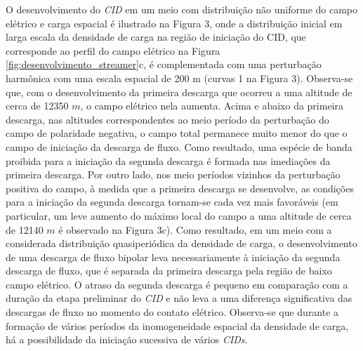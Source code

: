 \documentclass[a4paper, 12pt, onecolumn,singlespacing]{article}
\begin{document}
	O desenvolvimento do \textit{CID} em um meio com distribuição não uniforme do campo elétrico e carga espacial é ilustrado na Figura 3, onde a distribuição inicial em larga escala da densidade de carga na região de iniciação do CID, que corresponde ao perfil do campo elétrico na Figura \ref{fig:desenvolvimento_streamer}c, é complementada com uma perturbação harmônica com uma escala espacial de 200 m (curvas 1 na Figura 3). Observa-se que, com o desenvolvimento da primeira descarga que ocorreu a uma altitude de cerca de 12350 $m$, o campo elétrico nela aumenta. Acima e abaixo da primeira descarga, nas altitudes correspondentes ao meio período da perturbação do campo de polaridade negativa, o campo total permanece muito menor do que o campo de iniciação da descarga de fluxo. Como resultado, uma espécie de banda proibida para a iniciação da segunda descarga é formada nas imediações da primeira descarga. Por outro lado, nos meio períodos vizinhos da perturbação positiva do campo, à medida que a primeira descarga se desenvolve, as condições para a iniciação da segunda descarga tornam-se cada vez mais favoráveis (em particular, um leve aumento do máximo local do campo a uma altitude de cerca de 12140 $m$ é observado na Figura 3c). Como resultado, em um meio com a considerada distribuição quasiperiódica da densidade de carga, o desenvolvimento de uma descarga de fluxo bipolar leva necessariamente à iniciação da segunda descarga de fluxo, que é separada da primeira descarga pela região de baixo campo elétrico. O atraso da segunda descarga é pequeno em comparação com a duração da etapa preliminar do \textit{CID} e não leva a uma diferença significativa das descargas de fluxo no momento do contato elétrico. Observa-se que durante a formação de vários períodos da inomogeneidade espacial da densidade de carga, há a possibilidade da iniciação sucessiva de vários \textit{CIDs}.
\end{document}
